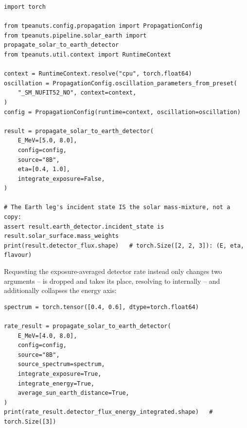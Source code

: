 \begin{examplebox}[title={Boron-8 solar neutrinos detected on a nadir-angle grid}]
\begin{lstlisting}[style=tpython]
import torch

from tpeanuts.config.propagation import PropagationConfig
from tpeanuts.pipeline.solar_earth import propagate_solar_to_earth_detector
from tpeanuts.util.context import RuntimeContext

context = RuntimeContext.resolve("cpu", torch.float64)
oscillation = PropagationConfig.oscillation_parameters_from_preset(
    "_SM_NUFIT52_NO", context=context,
)
config = PropagationConfig(runtime=context, oscillation=oscillation)

result = propagate_solar_to_earth_detector(
    E_MeV=[5.0, 8.0],
    config=config,
    source="8B",
    eta=[0.4, 1.0],
    integrate_exposure=False,
)

# The Earth leg's incident state IS the solar mass-mixture, not a copy:
assert result.earth_detector.incident_state is result.solar_surface.mass_weights
print(result.detector_flux.shape)   # torch.Size([2, 2, 3]): (E, eta, flavour)
\end{lstlisting}
\end{examplebox}

Requesting the exposure-averaged detector rate instead only changes two
arguments --  is dropped and  takes
its place, resolving to 
internally -- and  additionally collapses the
energy axis:
\begin{examplebox}[title={Exposure- and energy-integrated event rate}]
\begin{lstlisting}[style=tpython]
spectrum = torch.tensor([0.4, 0.6], dtype=torch.float64)

rate_result = propagate_solar_to_earth_detector(
    E_MeV=[4.0, 8.0],
    config=config,
    source="8B",
    source_spectrum=spectrum,
    integrate_exposure=True,
    integrate_energy=True,
    average_sun_earth_distance=True,
)
print(rate_result.detector_flux_energy_integrated.shape)   # torch.Size([3])
\end{lstlisting}
\end{examplebox}
